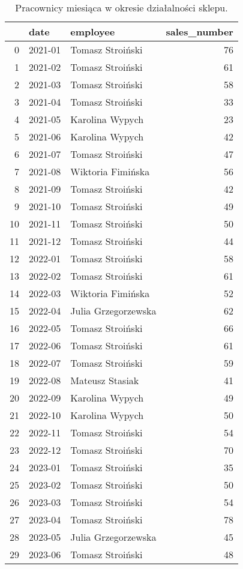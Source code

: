 \begin{table}[h]
\centering
\caption{Pracownicy miesiąca w okresie działalności sklepu.}\label{tab:tab1}
\begin{tabular}{rllr}
\hline
    & date    & employee            &   sales\_number \\
\hline
  0 & 2021-01 & Tomasz Stroiński    &             76 \\
  1 & 2021-02 & Tomasz Stroiński    &             61 \\
  2 & 2021-03 & Tomasz Stroiński    &             58 \\
  3 & 2021-04 & Tomasz Stroiński    &             33 \\
  4 & 2021-05 & Karolina Wypych     &             23 \\
  5 & 2021-06 & Karolina Wypych     &             42 \\
  6 & 2021-07 & Tomasz Stroiński    &             47 \\
  7 & 2021-08 & Wiktoria Fimińska   &             56 \\
  8 & 2021-09 & Tomasz Stroiński    &             42 \\
  9 & 2021-10 & Tomasz Stroiński    &             49 \\
 10 & 2021-11 & Tomasz Stroiński    &             50 \\
 11 & 2021-12 & Tomasz Stroiński    &             44 \\
 12 & 2022-01 & Tomasz Stroiński    &             58 \\
 13 & 2022-02 & Tomasz Stroiński    &             61 \\
 14 & 2022-03 & Wiktoria Fimińska   &             52 \\
 15 & 2022-04 & Julia Grzegorzewska &             62 \\
 16 & 2022-05 & Tomasz Stroiński    &             66 \\
 17 & 2022-06 & Tomasz Stroiński    &             61 \\
 18 & 2022-07 & Tomasz Stroiński    &             59 \\
 19 & 2022-08 & Mateusz Stasiak     &             41 \\
 20 & 2022-09 & Karolina Wypych     &             49 \\
 21 & 2022-10 & Karolina Wypych     &             50 \\
 22 & 2022-11 & Tomasz Stroiński    &             54 \\
 23 & 2022-12 & Tomasz Stroiński    &             70 \\
 24 & 2023-01 & Tomasz Stroiński    &             35 \\
 25 & 2023-02 & Tomasz Stroiński    &             50 \\
 26 & 2023-03 & Tomasz Stroiński    &             54 \\
 27 & 2023-04 & Tomasz Stroiński    &             78 \\
 28 & 2023-05 & Julia Grzegorzewska &             45 \\
 29 & 2023-06 & Tomasz Stroiński    &             48 \\
\hline
\end{tabular}\end{table}